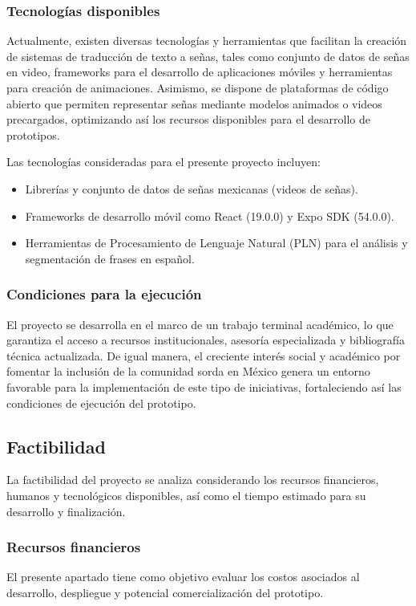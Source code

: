 \subsubsection{Tecnologías disponibles}
Actualmente, existen diversas tecnologías y herramientas que facilitan la creación de sistemas de traducción de texto a señas, tales como conjunto de datos de señas en video, frameworks para el desarrollo de aplicaciones móviles y herramientas para creación de animaciones. Asimismo, se dispone de plataformas de código abierto que permiten representar señas mediante modelos animados o videos precargados, optimizando así los recursos disponibles para el desarrollo de prototipos.

Las tecnologías consideradas para el presente proyecto incluyen:
\begin{itemize} 
	\item Librerías y conjunto de datos de señas mexicanas (videos de señas). 
	\item Frameworks de desarrollo móvil como React (19.0.0) y Expo SDK (54.0.0). 
	\item Herramientas de Procesamiento de Lenguaje Natural (PLN) para el análisis y segmentación de frases en español. 
\end{itemize}

\subsubsection{Condiciones para la ejecución}
El proyecto se desarrolla en el marco de un trabajo terminal académico, lo que garantiza el acceso a recursos institucionales, asesoría especializada y bibliografía técnica actualizada. De igual manera, el creciente interés social y académico por fomentar la inclusión de la comunidad sorda en México genera un entorno favorable para la implementación de este tipo de iniciativas, fortaleciendo así las condiciones de ejecución del prototipo.

\subsection{Factibilidad}
La factibilidad del proyecto se analiza considerando los recursos financieros, humanos y tecnológicos disponibles, así como el tiempo estimado para su desarrollo y finalización.

\subsubsection{Recursos financieros}
El presente apartado tiene como objetivo evaluar los costos asociados al desarrollo, despliegue y potencial comercialización del prototipo. 

